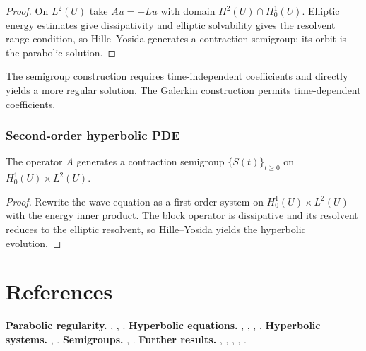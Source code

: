 \begin{proof}
\sketch On $L^2(U)$ take $Au=-Lu$ with domain $H^2(U)\cap H_0^1(U)$. Elliptic energy estimates give dissipativity and elliptic solvability gives the resolvent range condition, so Hille--Yosida generates a contraction semigroup; its orbit is the parabolic solution.
\end{proof}

\begin{remark}
\label{rem:parabolic-semigroup-remark}

The semigroup construction requires time-independent coefficients and directly yields a more regular solution. The Galerkin construction permits time-dependent coefficients.
\end{remark}

\subsubsection{Second-order hyperbolic PDE}

\begin{theorem}
\label{thm:hyperbolic-pde-as-semigroup}

The operator $A$ generates a contraction semigroup $\{S(t)\}_{t \geq 0}$ on $H_0^1(U) \times L^2(U)$.
\end{theorem}

\begin{proof}
\sketch Rewrite the wave equation as a first-order system on $H_0^1(U)\times L^2(U)$ with the energy inner product. The block operator is dissipative and its resolvent reduces to the elliptic resolvent, so Hille--Yosida yields the hyperbolic evolution.
\end{proof}

\section{References}
\label{sec:chapter7-references}
\textbf{Parabolic regularity.} \cite{Krylov1996}, \cite{LadyzhenskayaSolonnikovUraltseva1968}, \cite{Lieberman1996}.
\textbf{Hyperbolic equations.} \cite{Ladyzhenskaya1985}, \cite{Lions1961}, \cite{LionsMagenes1972}, \cite{Wloka1987}.
\textbf{Hyperbolic systems.} \cite{John1982}, \cite{Treves1975}.
\textbf{Semigroups.} \cite{Friedman1969}, \cite{Yosida1980}.
\textbf{Further results.} \cite{BrezisEvans1979}, \cite{LadyzhenskayaUraltseva1968}, \cite{Lieberman1996}, \cite{Friedman1969}, \cite{Yosida1980}.
